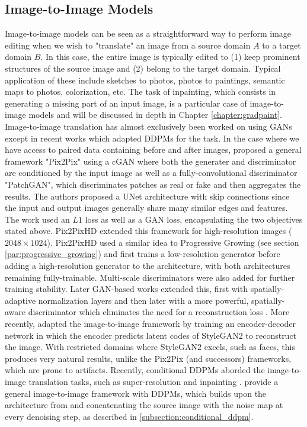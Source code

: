 \subsection{Image-to-Image Models}\label{subsection:image-to-image models}
Image-to-image models can be seen as a straightforward way to perform image editing when 
we wish to "translate" an image from a source domain $A$ to a target domain $B$. In this case, the entire image is typically 
edited to (1) keep prominent structures of the source image and (2) belong to the target 
domain. Typical application of these include sketches to photos, photos to paintings, 
semantic maps to photos, colorization, etc. The task of inpainting, which consists in generating a missing 
part of an input image, is a particular case of image-to-image models and will be discussed in depth in 
Chapter \ref{chapter:gradpaint}. Image-to-image translation has almost exclusively been worked on using \ac{GAN}s except 
in recent works which 
adapted \ac{DDPM}s for the task. In the case where we have access to paired data  containing 
before and after images, \cite{pix2pix} proposed a general framework "Pix2Pix" using a \ac{cGAN} 
where both the generater and discriminator are conditioned by the input image as well as a fully-convolutional 
discriminator "PatchGAN", which discriminates patches as real or fake and then aggregates the results.
The authors 
proposed a UNet architecture with skip connections since the input and output images generally share 
many similar edges and features. The work used an $L1$ loss as well as a \ac{GAN} loss,  
encapsulating the two objectives stated above. Pix2PixHD \citep{wang2018pix2pixHD}
extended this framework for 
high-resolution images ($2048 \times 1024$). Pix2PixHD used a similar idea to Progressive Growing (see 
section \ref{par:progressive_growing}) and first trains a low-resolution generator before  
adding a high-resolution generator to the architecture, with both architectures remaining fully-trainable.
Multi-scale discriminators were also added for further training stability.
Later  \ac{GAN}-based works extended this, first with spatially-adaptive normalization layers \citep{gaugan} and then
later with a more powerful, spatially-aware discriminator which eliminates the need for a reconstruction loss \citep{sushko2020you}.
 More recently, \cite{psp} adapted the image-to-image framework by training 
an encoder-decoder network in which the encoder predicts latent codes of StyleGAN2 \citep{karra2020stylegan2}
to reconstruct the image. With restricted domains where StyleGAN2 excels, such as faces, this produces  
very natural results, unlike the Pix2Pix (and successors) frameworks, which are prone to artifacts.
Recently, conditional \ac{DDPM}s aborded the image-to-image translation tasks, such as super-resolution \citep{saharia2022image} and 
inpainting \citep{nichol2021glide}. \cite{saharia2022palette} provide a general image-to-image framework with \ac{DDPM}s, 
which builds upon the architecture from \cite{dhariwal2021diffusion} and concatenating the source image with 
the noise map at every denoising step, as described in \ref{subsection:conditional_ddpm}. 

